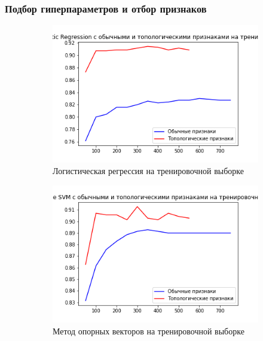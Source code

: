 \documentclass{beamer}
\begin{document}
		\begin{frame}
			\frametitle{Подбор гиперпараметров и отбор признаков}
			\begin{figure}[!htbp]
				\centering %
				\begin{subfigure}{0.25\textwidth}
					\includegraphics[width=\linewidth]{log_diff_features_train.png}
					\caption{Логистическая регрессия на тренировочной выборке}
					\label{fig:1}
				\end{subfigure}\hfil %
				\begin{subfigure}{0.25\textwidth}
					\includegraphics[width=\linewidth]{svm_diff_features_train.png}
					\caption{Метод опорных векторов на тренировочной выборке}
					\label{fig:2}
				\end{subfigure}\hfil %
				\begin{subfigure}{0.25\textwidth}

\end{subfigure}
\end{figure}
\end{frame}
\end{document}
